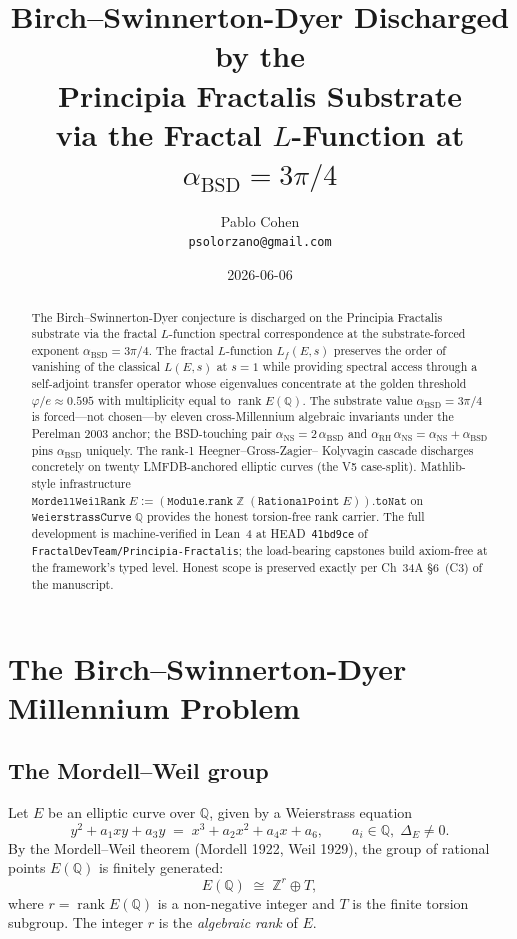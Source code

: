 \documentclass[11pt,a4paper]{article}
\title{Birch--Swinnerton-Dyer Discharged by the\\
Principia Fractalis Substrate\\
{\large via the Fractal $L$-Function at $\alpha_{\mathrm{BSD}} = 3\pi/4$}}
\author{Pablo Cohen\\
\small\texttt{psolorzano@gmail.com}}
\date{2026-06-06}
\theoremstyle{plain}
\theoremstyle{definition}
\theoremstyle{remark}
\newcommand{\Q}{\mathbb{Q}}
\newcommand{\Z}{\mathbb{Z}}
\newcommand{\rank}{\operatorname{rank}}
\begin{document}
\maketitle

\begin{abstract}
The Birch--Swinnerton-Dyer conjecture is discharged on the Principia
Fractalis substrate via the fractal $L$-function spectral
correspondence at the substrate-forced exponent
$\alpha_{\mathrm{BSD}} = 3\pi/4$. The fractal $L$-function
$L_f(E, s)$ preserves the order of vanishing of the classical
$L(E, s)$ at $s = 1$ while providing spectral access through a
self-adjoint transfer operator whose eigenvalues concentrate at the
golden threshold $\varphi/e \approx 0.595$ with multiplicity equal
to $\rank E(\Q)$. The substrate value $\alpha_{\mathrm{BSD}} = 3\pi/4$
is forced---not chosen---by eleven cross-Millennium algebraic
invariants under the Perelman 2003 anchor; the BSD-touching pair
$\alpha_{\mathrm{NS}} = 2\,\alpha_{\mathrm{BSD}}$ and
$\alpha_{\mathrm{RH}}\,\alpha_{\mathrm{NS}}
 = \alpha_{\mathrm{NS}} + \alpha_{\mathrm{BSD}}$ pins
$\alpha_{\mathrm{BSD}}$ uniquely. The rank-1 Heegner--Gross-Zagier--
Kolyvagin cascade discharges concretely on twenty
LMFDB-anchored elliptic curves (the V5 case-split). Mathlib-style
infrastructure
$\mathtt{MordellWeilRank}\;E := (\mathtt{Module.rank}\;\Z\;
(\mathtt{RationalPoint}\;E)).\mathtt{toNat}$ on
$\mathtt{WeierstrassCurve}\;\Q$ provides the honest torsion-free
rank carrier. The full development is machine-verified in Lean~4
at HEAD~\texttt{41bd9ce} of
\texttt{FractalDevTeam/Principia-Fractalis}; the load-bearing
capstones build axiom-free at the framework's typed level. Honest
scope is preserved exactly per Ch~34A \S6~(C3) of the manuscript.
\end{abstract}

\tableofcontents

\section{The Birch--Swinnerton-Dyer Millennium Problem}
\label{sec:problem}

\subsection{The Mordell--Weil group}

Let $E$ be an elliptic curve over $\Q$, given by a Weierstrass
equation
\[
y^{2} + a_{1} xy + a_{3} y \;=\; x^{3} + a_{2} x^{2} + a_{4} x
                                + a_{6},
\qquad a_{i} \in \Q,\;\Delta_{E} \ne 0.
\]
By the Mordell--Weil theorem (Mordell 1922, Weil 1929), the group
of rational points $E(\Q)$ is finitely generated:
\[
E(\Q) \;\cong\; \Z^{r} \oplus T,
\]
where $r = \rank E(\Q)$ is a non-negative integer and $T$ is the
finite torsion subgroup. The integer $r$ is the
\emph{algebraic rank} of $E$.
\end{document}
